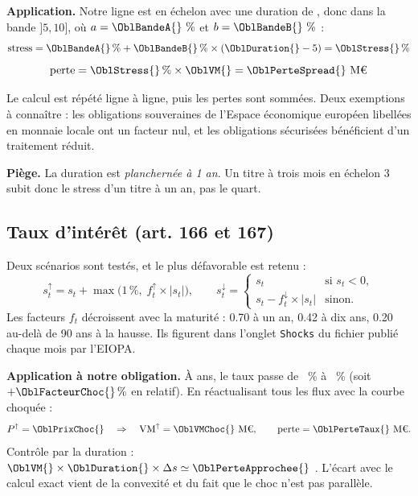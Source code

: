 \documentclass[11pt,a4paper]{article}
\newcommand{\piege}[1]{\par\smallskip\noindent\textcolor{rouge}{\textbf{Piège.}} #1\par\smallskip}
\newcommand{\Meuro}{\text{M\texteuro}}
\begin{document}
\begin{methode}
\textbf{Application.} Notre ligne est en échelon \OblCqs{} avec une duration de \OblDuration{},
donc dans la bande $]5,10]$, où $a = \OblBandeA{}~\%$ et $b = \OblBandeB{}~\%$ :
\[
\mathrm{stress} = \OblBandeA{}\,\% + \OblBandeB{}\,\% \times (\OblDuration{} - 5) = \OblStress{}\,\%
\]
\[
\text{perte} = \OblStress{}\,\% \times \OblVM{} = \OblPerteSpread{}~\Meuro{}
\]
\end{methode}

Le calcul est répété ligne à ligne, puis les pertes sont sommées. Deux exemptions à connaître :
les obligations souveraines de l'Espace économique européen libellées en monnaie locale ont un
facteur nul, et les obligations sécurisées bénéficient d'un traitement réduit.

\piege{La duration est \emph{plancher\-née à 1 an}. Un titre à trois mois en échelon 3 subit donc
le stress d'un titre à un an, pas le quart.}

\subsection{Taux d'intérêt (art. 166 et 167)}

Deux scénarios sont testés, et le plus défavorable est retenu :
\[
s_t^{\uparrow} = s_t + \max\bigl(1\,\%,\; f^{\uparrow}_t \times |s_t|\bigr),
\qquad
s_t^{\downarrow} = \begin{cases} s_t & \text{si } s_t < 0,\\[2pt]
s_t - f^{\downarrow}_t \times |s_t| & \text{sinon.}\end{cases}
\]
Les facteurs $f_t$ décroissent avec la maturité : \num{0.70} à un an, \num{0.42} à dix ans,
\num{0.20} au-delà de 90 ans à la hausse. Ils figurent dans l'onglet \texttt{Shocks} du fichier
publié chaque mois par l'EIOPA.

\begin{methode}
\textbf{Application à notre obligation.} À \OblMaturite{} ans, le taux passe de \OblSpotHuit{}~\%
à \OblSpotHuitChoc{}~\% (soit $+\OblFacteurChoc{}\,\%$ en relatif). En réactualisant tous les flux
avec la courbe choquée :
\[
P^{\uparrow} = \OblPrixChoc{} \quad\Rightarrow\quad
\text{VM}^{\uparrow} = \OblVMChoc{}~\Meuro{}, \qquad
\text{perte} = \OblPerteTaux{}~\Meuro{}.
\]
Contrôle par la duration : $\OblVM{} \times \OblDuration{} \times \Delta s \simeq
\OblPerteApprochee{}$ \Meuro{}. L'écart avec le calcul exact vient de la convexité et du fait que
le choc n'est pas parallèle.
\end{methode}
\end{document}
